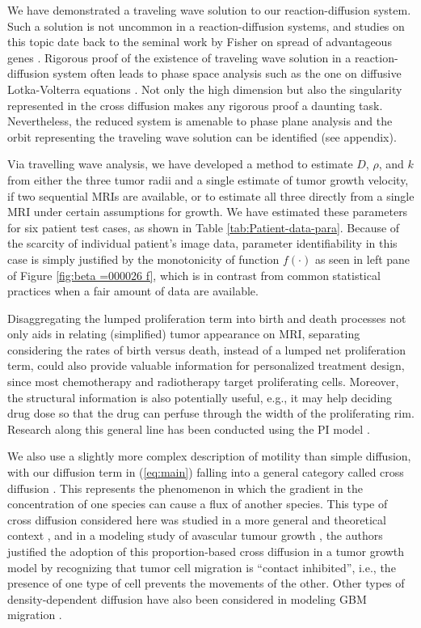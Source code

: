 \documentclass{aims}
\numberwithin{equation}{section}
\begin{document}
We have demonstrated a traveling wave solution to our reaction-diffusion system.  Such a solution is not uncommon in a reaction-diffusion systems,
and studies on this topic date back to the seminal work by Fisher on spread of advantageous genes \cite{FISHER1937}. Rigorous
proof of the existence of traveling wave solution in a reaction-diffusion
system often leads to phase space analysis such as the one on diffusive Lotka-Volterra equations \cite{Dunbar1983}.
Not only the high dimension but also the singularity represented in
the cross diffusion makes any rigorous proof a daunting task. Nevertheless,
the reduced system is amenable to phase plane analysis and the orbit representing the traveling wave solution can be identified (see appendix).

Via travelling wave analysis, we have developed a method to estimate $D$, $\rho$, and $k$ from either the three tumor radii and a single estimate of tumor growth velocity, if two sequential MRIs are available, or to estimate all three directly from a single MRI under certain assumptions for growth.  We have estimated these parameters for six patient test cases, as shown in Table \ref{tab:Patient-data-para}. Because of the scarcity of individual patient's image data, parameter identifiability in this case is simply justified by the monotonicity of function  $f(\cdot)$ as seen in left pane of Figure \ref{fig:beta =000026 f}, which is in contrast from common statistical practices \cite{Eisenberg2017} when a fair amount of data are available. 
   

Disaggregating the lumped proliferation term into birth and death processes not only aids in relating (simplified) tumor appearance on MRI, separating considering the rates of birth versus death, instead of a lumped net proliferation term, could also provide valuable information for personalized treatment
design, since most chemotherapy and radiotherapy target proliferating cells. Moreover, the structural information is also potentially useful,
e.g., it may help deciding drug dose so that the drug can perfuse through the width of the proliferating rim. Research along this general line has been conducted using the PI model \cite{Kim2017}.

We also use a slightly more complex description of motility than simple diffusion, with our diffusion term in (\ref{eq:main}) falling into a general category called cross diffusion \cite{Madzvamuse2017}.  This represents the phenomenon in which
the gradient in the concentration of one species can cause a flux
of another species. This type of cross diffusion considered here was
studied in a more general and theoretical context \cite{Sherratt2000}, and in a modeling study of avascular tumour growth \cite{Sherratt2001b}, the authors justified the adoption of this
proportion-based cross diffusion in a tumor growth model by recognizing
that tumor cell migration is ``contact inhibited'', i.e., the presence
of one type of cell prevents the movements of the other. Other types of density-dependent
diffusion have also been considered in modeling GBM migration \cite{Stepien2015}.
\end{document}
